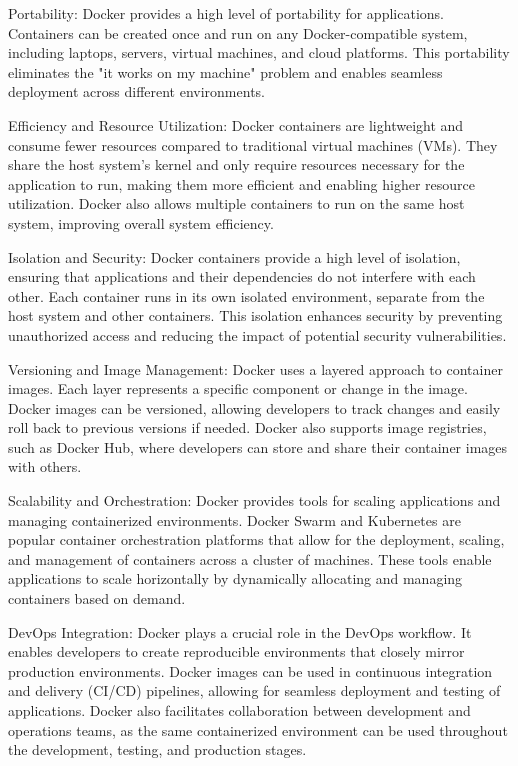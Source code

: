 \documentclass[
12pt,
oneside, 
onehalfspacing, 
nolistspacing, 
parskip, 
chapterinoneline, 
]{AASTCOMPUTER}
\begin{document}
Portability: Docker provides a high level of portability for applications. Containers can be created once and run on any Docker-compatible system, including laptops, servers, virtual machines, and cloud platforms. This portability eliminates the "it works on my machine" problem and enables seamless deployment across different environments.

Efficiency and Resource Utilization: Docker containers are lightweight and consume fewer resources compared to traditional virtual machines (VMs). They share the host system's kernel and only require resources necessary for the application to run, making them more efficient and enabling higher resource utilization. Docker also allows multiple containers to run on the same host system, improving overall system efficiency.

Isolation and Security: Docker containers provide a high level of isolation, ensuring that applications and their dependencies do not interfere with each other. Each container runs in its own isolated environment, separate from the host system and other containers. This isolation enhances security by preventing unauthorized access and reducing the impact of potential security vulnerabilities.

Versioning and Image Management: Docker uses a layered approach to container images. Each layer represents a specific component or change in the image. Docker images can be versioned, allowing developers to track changes and easily roll back to previous versions if needed. Docker also supports image registries, such as Docker Hub, where developers can store and share their container images with others.

Scalability and Orchestration: Docker provides tools for scaling applications and managing containerized environments. Docker Swarm and Kubernetes are popular container orchestration platforms that allow for the deployment, scaling, and management of containers across a cluster of machines. These tools enable applications to scale horizontally by dynamically allocating and managing containers based on demand.

DevOps Integration: Docker plays a crucial role in the DevOps workflow. It enables developers to create reproducible environments that closely mirror production environments. Docker images can be used in continuous integration and delivery (CI/CD) pipelines, allowing for seamless deployment and testing of applications. Docker also facilitates collaboration between development and operations teams, as the same containerized environment can be used throughout the development, testing, and production stages.
\end{document}
